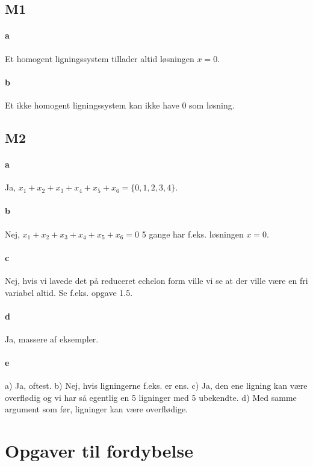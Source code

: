 		\subsection{M1}

			\paragraph{a} Et homogent ligningssystem tillader altid løsningen $x=0$.

			\paragraph{b} Et ikke homogent ligningssystem kan ikke have 0 som løsning.

		\subsection{M2}

			\paragraph{a} Ja, $x_1+x_2+x_3+x_4+x_5+x_6=\{0,1,2,3,4\}$.

			\paragraph{b} Nej, $x_1+x_2+x_3+x_4+x_5+x_6=0$ 5 gange har f.eks. løsningen $x=0$.

			\paragraph{c} Nej, hvis vi lavede det på reduceret echelon form ville vi se at der ville være en fri variabel altid. Se f.eks. opgave 1.5.

			\paragraph{d} Ja, massere af eksempler.

			\paragraph{e} a) Ja, oftest. b) Nej, hvis ligningerne f.eks. er ens. c) Ja, den ene ligning kan være overflødig og vi har så egentlig en 5 ligninger med 5 ubekendte. d) Med samme argument som før, ligninger kan være overflødige. 

	\section{Opgaver til fordybelse}

